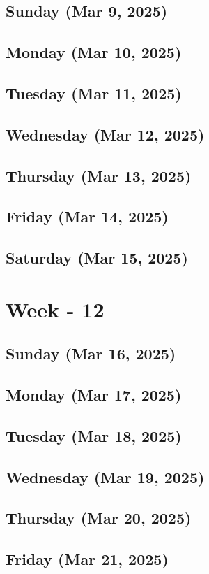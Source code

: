 \subsection*{Sunday (Mar 9, 2025)}
\subsection*{Monday (Mar 10, 2025)}
\subsection*{Tuesday (Mar 11, 2025)}
\subsection*{Wednesday (Mar 12, 2025)}
\subsection*{Thursday (Mar 13, 2025)}
\subsection*{Friday (Mar 14, 2025)}
\subsection*{Saturday (Mar 15, 2025)}

\section{Week - 12}
\subsection*{Sunday (Mar 16, 2025)}
\subsection*{Monday (Mar 17, 2025)}
\subsection*{Tuesday (Mar 18, 2025)}
\subsection*{Wednesday (Mar 19, 2025)}
\subsection*{Thursday (Mar 20, 2025)}
\subsection*{Friday (Mar 21, 2025)}
